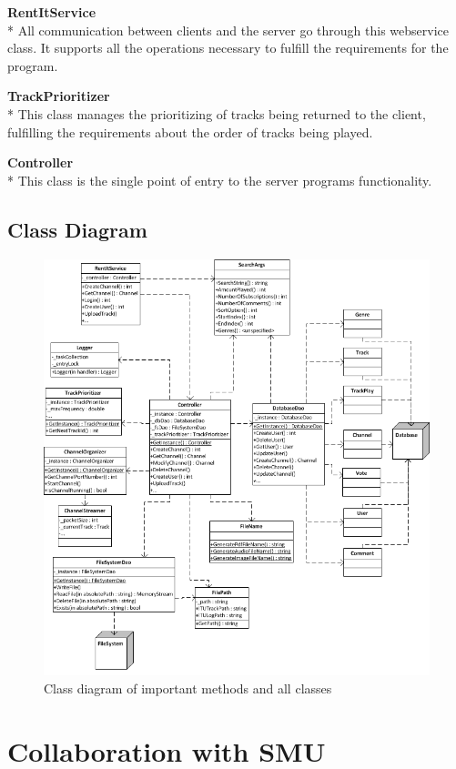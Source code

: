 \documentclass[a4paper,11pt,report]{article}
\begin{document}
\textbf{RentItService} \\*
All communication between clients and the server go through this webservice class. It supports all the operations necessary to fulfill the requirements for the program. 

\textbf{TrackPrioritizer} \\*
This class manages the prioritizing of tracks being returned to the client, fulfilling the requirements about the order of tracks being played.

\textbf{Controller} \\*
This class is the single point of entry to the server programs functionality.

\newpage
\subsection{Class Diagram}
\begin{figure}[H]
  \centering
\includegraphics[]{./ClassDiagramITU.png}
\caption{Class diagram of important methods and all classes}
\end{figure}

\section{Collaboration with SMU}
\end{document}
